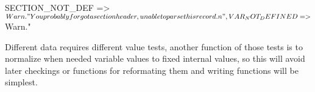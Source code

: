 \documentclass[11pt]{article}
\def\nwendcode{\endtrivlist \endgroup} %
\let\nwdocspar=\par                    %
\begin{document}
\nwenddocs{}\endmoddef
SECTION_NOT_DEF =>
  $Warn."You probably forgot a section header, unable to parse this record.\\n",
VAR_NOT_DEFINED =>
  $Warn."\\%
\nwendcode{}\nwdocspar

Different data requires different value tests, another function of those tests is to normalize when needed variable values to fixed internal values, so this will avoid later checkings or functions for reformating them and writing functions
will be simplest.
\end{document}
